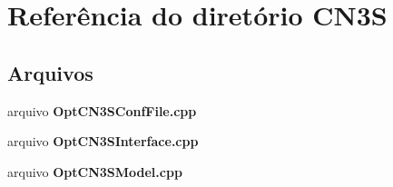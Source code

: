 \section{Referência do diretório C\+N3S}
\label{dir_e2da94ce5ead7d39fa865d59f42affd6}
\subsection*{Arquivos}
\begin{DoxyCompactItemize}
\item 
arquivo {\bf Opt\+C\+N3\+S\+Conf\+File.\+cpp}
\item 
arquivo {\bf Opt\+C\+N3\+S\+Interface.\+cpp}
\item 
arquivo {\bf Opt\+C\+N3\+S\+Model.\+cpp}
\end{DoxyCompactItemize}
